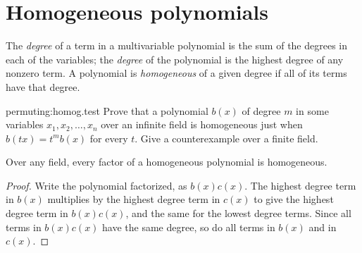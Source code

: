 \section{Homogeneous polynomials}
The \emph{degree} of a term in a multivariable polynomial is the sum of the degrees in each of the variables; the \emph{degree} of the polynomial is the highest degree of any nonzero term.
A polynomial is \emph{homogeneous} of a given degree if all of its terms have that degree.
\begin{problem}{permuting:homog.test}
Prove that a polynomial \(b(x)\) of degree \(m\) in some variables \(x_1,x_2,\dots,x_n\) over an infinite field is homogeneous just when \(b(tx)=t^mb(x)\) for every \(t\).
Give a counterexample over a finite field.
\end{problem}
\begin{lemma}
Over any field, every factor of a homogeneous polynomial is homogeneous.
\end{lemma}
\begin{proof}
Write the polynomial factorized, as
\(
b(x)c(x)
\).
The highest degree term in \(b(x)\) multiplies by the highest degree term in \(c(x)\) to give the highest degree term in \(b(x)c(x)\), and the same for the lowest degree terms.
Since all terms in \(b(x)c(x)\) have the same degree, so do all terms in \(b(x)\) and in \(c(x)\).
\end{proof}
